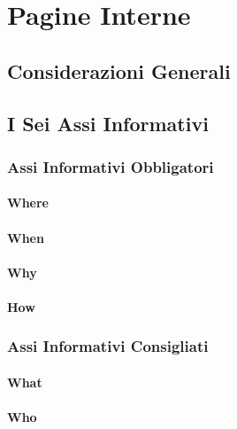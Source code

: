 \section{Pagine Interne}

\subsection{Considerazioni Generali}

\subsection{I Sei Assi Informativi}

\subsubsection{Assi Informativi Obbligatori}
\paragraph{Where}
\paragraph{When}
\paragraph{Why}
\paragraph{How}
\subsubsection{Assi Informativi Consigliati}
\paragraph{What}
\paragraph{Who}